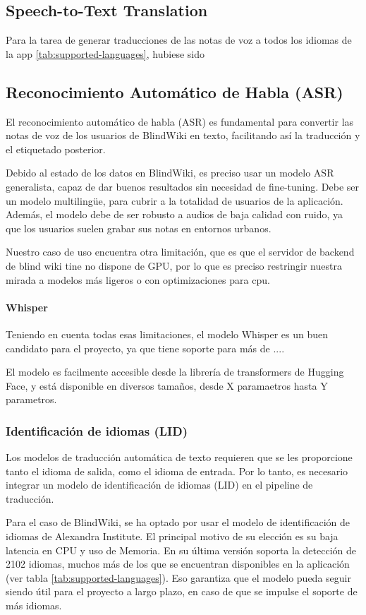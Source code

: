 \subsection{Speech-to-Text Translation}
Para la tarea de generar traducciones de las notas de voz a todos los idiomas de la app \ref{tab:supported-languages}, hubiese sido 
\subsection{Reconocimiento Automático de Habla (ASR)}

El reconocimiento automático de habla (ASR) es fundamental para convertir las notas de voz de los usuarios de BlindWiki en texto, facilitando así la traducción y el etiquetado posterior.

Debido al estado de los datos en BlindWiki, es preciso usar un modelo ASR generalista, capaz de dar buenos resultados sin necesidad de fine-tuning. Debe ser un modelo multilingüe, para cubrir a la totalidad de usuarios de la aplicación. Además, el modelo debe de ser robusto a audios de baja calidad con ruido, ya que los usuarios suelen grabar sus notas en entornos urbanos.

Nuestro caso de uso encuentra otra limitación, que es que el servidor de backend de blind wiki tine no dispone de GPU, por lo que es preciso restringir nuestra mirada a modelos más ligeros o con optimizaciones para cpu.

\paragraph{Whisper}
Teniendo en cuenta todas esas limitaciones, el modelo Whisper es un buen candidato para el proyecto, ya que tiene soporte para más de ....

El modelo es facilmente accesible desde la librería de transformers de Hugging Face, y está disponible en diversos tamaños, desde X paramaetros hasta Y parametros.

\subsubsection{Identificación de idiomas (LID)}
Los modelos de traducción automática de texto requieren que se les proporcione tanto el idioma de salida, como el idioma de entrada. Por lo tanto, es necesario integrar un modelo de identificación de idiomas (LID) en el pipeline de traducción.

Para el caso de BlindWiki, se ha optado por usar el modelo de identificación de idiomas de Alexandra Institute. El principal motivo de su elección es su baja latencia en CPU y uso de Memoria. En su última versión soporta la detección de 2102 idiomas, muchos más de los que se encuentran disponibles en la aplicación (ver tabla \ref{tab:supported-languages}). Eso garantiza que el modelo pueda seguir siendo útil para el proyecto a largo plazo, en caso de que se impulse el soporte de más idiomas.

